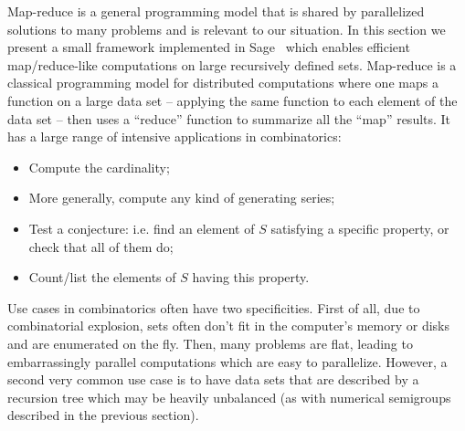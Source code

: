 \documentclass{deliverablereport}
\begin{document}
Map-reduce is a general programming model that is shared by
parallelized solutions to many problems and is relevant to our situation. In this section we
present a small framework implemented in Sage~\cite{sage} which enables
efficient map/reduce-like computations on
large recursively defined sets. Map-reduce is a classical programming model
for distributed computations where one maps a function on a large data set --
applying the same function to each element of the data set -- then
uses a ``reduce'' function to summarize all the ``map'' results. It has a
large range of intensive applications in combinatorics:
\begin{itemize}
  \item Compute the cardinality;
  \item More generally, compute any kind of generating series;
  \item Test a conjecture: i.e. find an element of $S$ satisfying a specific
    property, or check that all of them do;
  \item Count/list the elements of $S$ having this property.
\end{itemize}
Use cases in combinatorics often have two specificities. First of all, due to
combinatorial explosion, sets often don't fit in the computer's memory or
disks and are enumerated on the fly. Then, many problems are flat, leading to
embarrassingly parallel computations which are easy to parallelize. However, a
second very common use case is to have data sets that are described by a
recursion tree which may be heavily unbalanced (as with numerical semigroups
described in the previous section).
\end{document}
